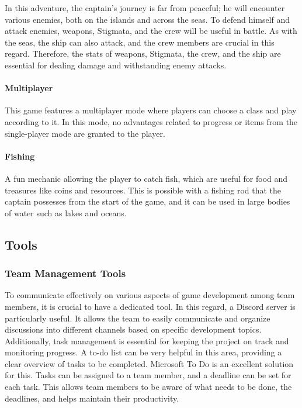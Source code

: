 \documentclass{article}
\begin{document}
In this adventure, the captain's journey is far from peaceful; he will encounter various enemies, both on the islands and across the seas. To defend himself and attack enemies, weapons, Stigmata, and the crew will be useful in battle. As with the seas, the ship can also attack, and the crew members are crucial in this regard. Therefore, the stats of weapons, Stigmata, the crew, and the ship are essential for dealing damage and withstanding enemy attacks.

\paragraph{Multiplayer}\hfill

This game features a multiplayer mode where players can choose a class and play according to it. In this mode, no advantages related to progress or items from the single-player mode are granted to the player.

\paragraph{Fishing}\hfill

A fun mechanic allowing the player to catch fish, which are useful for food and treasures like coins and resources. This is possible with a fishing rod that the captain possesses from the start of the game, and it can be used in large bodies of water such as lakes and oceans.





\subsection{Tools}
\subsubsection{Team Management Tools}\hfill

To communicate effectively on various aspects of game development among team members, it is crucial to have a dedicated tool. In this regard, a Discord server is particularly useful. It allows the team to easily communicate and organize discussions into different channels based on specific development topics.\\

Additionally, task management is essential for keeping the project on track and monitoring progress. A to-do list can be very helpful in this area, providing a clear overview of tasks to be completed. Microsoft To Do is an excellent solution for this. Tasks can be assigned to a team member, and a deadline can be set for each task. This allows team members to be aware of what needs to be done, the deadlines, and helps maintain their productivity.
\end{document}
